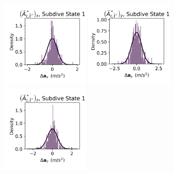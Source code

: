 \documentclass{article}
\begin{document}
        \begin{center}
        \includegraphics[width=1.75in]{../Plots/CarHHMM1_empirical_hist_Ax_0.png}
        \includegraphics[width=1.75in]{../Plots/CarHHMM1_empirical_hist_Ay_0.png}
        \includegraphics[width=1.75in]{../Plots/CarHHMM1_empirical_hist_Az_0.png}
        

\end{center}
\end{document}
